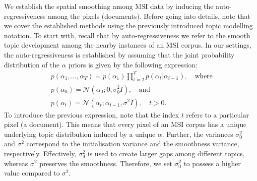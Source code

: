 \documentclass{mpaper}
\begin{document}
\par We establish the spatial smoothing among MSI data by inducing the auto-regressiveness among the pixels (documents). Before going into details, note that we cover the established methods using the previously introduced topic modelling notation. To start with, recall that by auto-regressiveness we refer to the smooth topic development among the nearby instances of an MSI corpus. In our settings, the auto-regressiveness is established by assuming that the joint probability distribution of the $\alpha$ priors is given by the following expression:
\begin{align*}
&p(\alpha_1,\ldots,\alpha_T) =p(\alpha_1)\prod_{t=2}^{T}{p(\alpha_t|\alpha_{t-1})}, \quad \mbox{where}\\
&p(\alpha_0) =\mathcal{N} (\alpha_0; 0, \sigma_0^2I), \quad \mbox{and}\\
&p(\alpha_t) =\mathcal{N} (\alpha_t; \alpha_{t-1}, \sigma^2I), \quad t>0.
\end{align*}
To introduce the previous expression, note that the index $t$ refers to a particular pixel (a document). This means that every pixel of an MSI corpus has a unique underlying topic distribution induced by a unique $\alpha$. Further, the variances $\sigma_0^2$ and $\sigma^2$ correspond to the initialisation variance and the smoothness variance, respectively. Effectively, $\sigma_0^2$ is used to create larger gaps among different topics, whereas $\sigma^2$ preserves the smoothness. Therefore, we set $\sigma_0^2$ to possess a higher value compared to $\sigma^2$.
\end{document}
